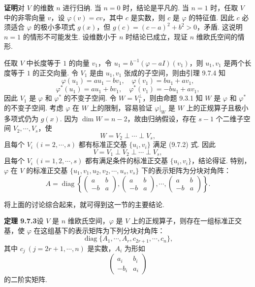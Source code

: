 \documentclass[UTF8,12pt,a4paper,fontset=fandol]{ctexart}
\begin{document}
\noindent\textbf{证明}\quad 对 $V$ 的维数 $n$ 进行归纳. 当 $n=0$ 时，结论是平凡的. 当 $n=1$ 时，任取 $V$ 中的非零向量 $v$，设 $\varphi(v)=cv$，其中 $c$ 是实数，则 $c$ 是 $\varphi$ 的特征值. 因此 $c$ 必须适合 $\varphi$ 的极小多项式 $g(x)$，但 $g(c)=(c-a)^2+b^2>0$，矛盾. 这说明 $n=1$ 的情形不可能发生. 设维数小于 $n$ 时结论已成立，现证 $n$ 维欧氏空间的情形.

任取 $V$ 中长度等于 $1$ 的向量 $v_1$，令 $u_1=b^{-1}(\varphi-aI)(v_1)$，则 $u_1,v_1$ 是两个长度等于 $1$ 的正交向量. 令 $V_1$ 是由 $u_1,v_1$ 张成的子空间，则由引理 9.7.4 知
\[
  \varphi(u_1)=au_1-bv_1,\quad \varphi(v_1)=bu_1+av_1,
\]
\[
  \varphi^*(u_1)=au_1+bv_1,\quad \varphi^*(v_1)=-bu_1+av_1,
\]
因此 $V_1$ 是 $\varphi$ 和 $\varphi^*$ 的不变子空间. 令 $W=V_1^\perp$，则由命题 9.3.1 知 $W$ 是 $\varphi$ 和 $\varphi^*$ 的不变子空间. 考虑 $\varphi$ 在 $W$ 上的限制，容易验证 $\varphi|_W$ 是 $W$ 上的正规算子且极小多项式仍为 $g(x)$. 因为 $\dim W=n-2$，故由归纳假设，存在 $s-1$ 个二维子空间 $V_2,\cdots,V_s$，使
\[
  W=V_2\perp\cdots\perp V_s,
\]
且每个 $V_i\ (i=2,\cdots,s)$ 都有标准正交基 $\{u_i,v_i\}$ 满足 (9.7.2) 式. 因此
\[
  V=V_1\perp V_2\perp\cdots\perp V_s,
\]
且每个 $V_i\ (i=1,2,\cdots,s)$ 都有满足条件的标准正交基 $\{u_i,v_i\}$，结论得证. 特别，$\varphi$ 在 $V$ 的标准正交基 $\{u_1,v_1,u_2,v_2,\cdots,u_s,v_s\}$ 下的表示矩阵为分块对角阵：
\[
  A=\operatorname{diag}\left\{
  \left(\begin{array}{cc}
    a & b\\
    -b & a
  \end{array}\right),
  \left(\begin{array}{cc}
    a & b\\
    -b & a
  \end{array}\right),
  \cdots,
  \left(\begin{array}{cc}
    a & b\\
    -b & a
  \end{array}\right)
  \right\}.
\]

将上面的讨论综合起来，就可得到这一节的主要结论.

\noindent\textbf{定理 9.7.3}\quad 设 $V$ 是 $n$ 维欧氏空间，$\varphi$ 是 $V$ 上的正规算子，则存在一组标准正交基，使 $\varphi$ 在这组基下的表示矩阵为下列分块对角阵：
\begin{equation}
  \operatorname{diag}\{A_1,\cdots,A_r,c_{2r+1},\cdots,c_n\},
  \tag{9.7.3}
\end{equation}
其中 $c_j\ (j=2r+1,\cdots,n)$ 是实数，$A_i$ 为形如
\[
  \left(\begin{array}{cc}
    a_i & b_i\\
    -b_i & a_i
  \end{array}\right)
\]
的二阶实矩阵.
\end{document}
